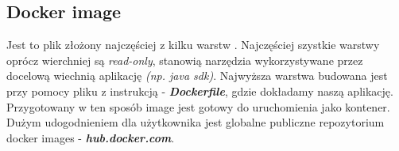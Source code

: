 \subsection{Docker image}
Jest to plik złożony najczęściej z kilku warstw \cite{docker-doc}. 
Najczęściej szystkie warstwy oprócz wierchniej są \emph{read-only}, stanowią narzędzia wykorzystywane przez docelową wiechnią aplikację \emph{(np. java sdk)}.
Najwyższa warstwa budowana jest przy pomocy pliku z instrukcją - \emph{\textbf{Dockerfile}}, gdzie dokładamy naszą aplikację.
Przygotowany w ten sposób image jest gotowy do uruchomienia jako kontener. Dużym udogodnieniem dla użytkownika jest globalne publiczne repozytorium docker images - \emph{\textbf{hub.docker.com}}.


